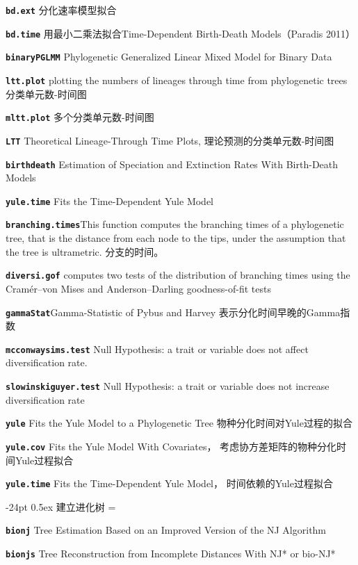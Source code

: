 \documentclass[10pt,landscape]{article}
\makeatletter
\renewcommand\section{\@startsection{section}{1}{0mm}%
                                     {-24pt}%
                                     {0.5ex}%
                                {\color{blue}\normalfont\large\bfseries}}
\newcommand{\bcode}[1]{\texttt{\textbf{#1}}}
\makeatother
\begin{document}
\begin{CJK}{UTF8}{gbsn}
\begin{multicols}{3}
\bcode{bd.ext} 分化速率模型拟合

\bcode{bd.time} 用最小二乘法拟合Time-Dependent Birth-Death Models（Paradis 2011）

\bcode{binaryPGLMM} Phylogenetic Generalized Linear Mixed Model for Binary Data

\bcode{ltt.plot} plotting the numbers of lineages through time from phylogenetic trees 分类单元数-时间图 

\bcode{mltt.plot} 多个分类单元数-时间图 

\bcode{LTT} Theoretical Lineage-Through Time Plots, 理论预测的分类单元数-时间图

\bcode{birthdeath} Estimation of Speciation and Extinction Rates With Birth-Death Models

\bcode{yule.time} Fits the Time-Dependent Yule Model

\bcode{branching.times}This function computes the branching times of a phylogenetic tree, that is the distance from each node to the tips, under the assumption that the tree is ultrametric. 分支的时间。 

\bcode{diversi.gof} computes two tests of the distribution of branching times using the Cramér–von Mises and Anderson–Darling goodness-of-fit tests

\bcode{gammaStat}Gamma-Statistic of Pybus and Harvey 表示分化时间早晚的Gamma指数

\bcode{mcconwaysims.test} Null Hypothesis: a trait or variable does not affect diversification rate.

\bcode{slowinskiguyer.test} Null Hypothesis: a trait or variable does not increase diversification rate

\bcode{yule}    Fits the Yule Model to a Phylogenetic Tree 物种分化时间对Yule过程的拟合

\bcode{yule.cov}    Fits the Yule Model With Covariates， 考虑协方差矩阵的物种分化时间Yule过程拟合

\bcode{yule.time}   Fits the Time-Dependent Yule Model， 时间依赖的Yule过程拟合

\section{建立进化树}
\everypar={\hangindent=9mm}

\bcode{bionj} Tree Estimation Based on an Improved Version of the NJ Algorithm

\bcode{bionjs} Tree Reconstruction from Incomplete Distances With NJ* or bio-NJ*


\end{multicols}
\end{CJK}
\end{document}
